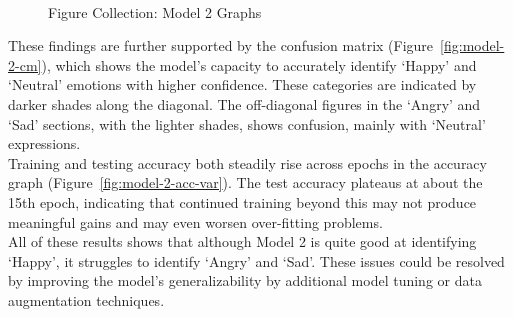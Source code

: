 \begin{figure}[H]
    \centering
    \qquad
    \vspace{0.5cm}
    \\
    \scriptsize{Figure Collection: Model 2 Graphs}
\end{figure}
\indent These findings are further supported by the confusion matrix (Figure~\ref{fig:model-2-cm}), which shows the model's capacity to accurately identify `Happy' and `Neutral' emotions with higher confidence.
These categories are indicated by darker shades along the diagonal.
The off-diagonal figures in the `Angry' and `Sad' sections, with the lighter shades, shows confusion, mainly with `Neutral' expressions.
\\
\indent Training and testing accuracy both steadily rise across epochs in the accuracy graph (Figure~\ref{fig:model-2-acc-var}).
The test accuracy plateaus at about the 15th epoch, indicating that continued training beyond this may not produce meaningful gains and may even worsen over-fitting problems.
\\
\indent All of these results shows that although Model 2 is quite good at identifying `Happy', it struggles to identify `Angry' and `Sad'.
These issues could be resolved by improving the model's generalizability by additional model tuning or data augmentation techniques.

